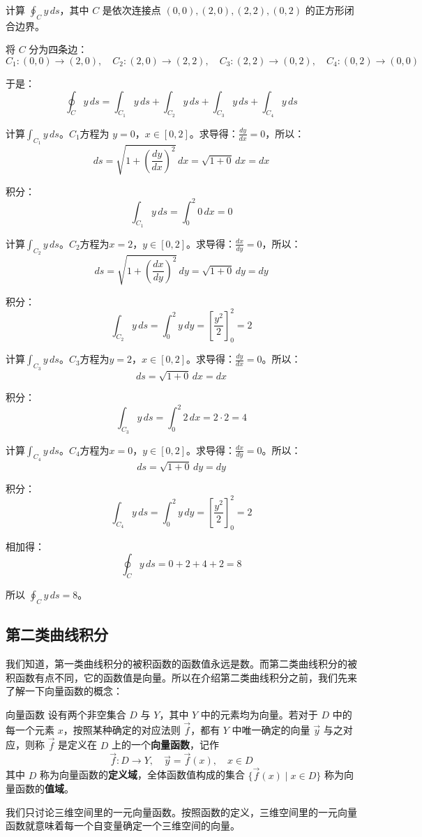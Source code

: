 \begin{myexample}
    计算 \(\oint_C y\,ds\)，其中 \(C\) 是依次连接点 \((0,0), (2,0), (2,2), (0,2)\) 的正方形闭合边界。

将 \(C\) 分为四条边：
\[
C_1: (0,0)\to(2,0),\quad C_2: (2,0)\to(2,2),\quad C_3: (2,2)\to(0,2),\quad C_4: (0,2)\to(0,0)
\]

于是：
\[
\oint_C y\,ds = \int_{C_1} y\,ds + \int_{C_2} y\,ds + \int_{C_3} y\,ds + \int_{C_4} y\,ds
\]

计算\(\int_{C_1} y\,ds\)。\(C_1\)方程为 \(y=0\)，\(x\in[0,2]\)。求导得：\(\frac{dy}{dx}=0\)，所以：
\[
ds = \sqrt{1+\left(\frac{dy}{dx}\right)^2}\,dx = \sqrt{1+0}\,dx = dx
\]

积分：
\[
\int_{C_1} y\,ds = \int_{0}^{2} 0\,dx = 0
\]

计算\(\int_{C_2} y\,ds\)。\(C_2\)方程为\(x=2\)，\(y\in[0,2]\)。求导得：\(\frac{dx}{dy}=0\)，所以：
\[
ds = \sqrt{1+\left(\frac{dx}{dy}\right)^2}\,dy = \sqrt{1+0}\,dy = dy
\]

积分：
\[
\int_{C_2} y\,ds = \int_{0}^{2} y\,dy = \left[\frac{y^2}{2}\right]_{0}^{2} = 2
\]

计算\(\int_{C_3} y\,ds\)。\(C_3\)方程为\(y=2\)，\(x\in[0,2]\)。求导得：\(\frac{dy}{dx}=0\)。所以：
\[
ds = \sqrt{1+0}\,dx = dx
\]

积分：
\[
\int_{C_3} y\,ds = \int_{0}^{2} 2\,dx = 2\cdot 2 = 4
\]

计算\(\int_{C_4} y\,ds\)。\(C_4\)方程为\(x=0\)，\(y\in[0,2]\)。求导得：\(\frac{dx}{dy}=0\)。所以：
\[
ds = \sqrt{1+0}\,dy = dy
\]

积分：
\[
\int_{C_4} y\,ds = \int_{0}^{2} y\,dy = \left[\frac{y^2}{2}\right]_{0}^{2} = 2
\]

相加得：
\[
\oint_C y\,ds = 0 + 2 + 4 + 2 = 8
\]

所以 \(\oint_C y\,ds = 8\)。
\end{myexample}

\subsection{第二类曲线积分}
我们知道，第一类曲线积分的被积函数的函数值永远是数。而第二类曲线积分的被积函数有点不同，它的函数值是向量。所以在介绍第二类曲线积分之前，我们先来了解一下向量函数的概念：
\begin{definition}{向量函数}{}
    设有两个非空集合 \(D\) 与 \(Y\)，其中 \(Y\) 中的元素均为向量。若对于 \(D\) 中的每一个元素 \(x\)，按照某种确定的对应法则 \(\vec{f}\)，都有 \(Y\) 中唯一确定的向量 \(\vec{y}\) 与之对应，则称 \(\vec{f}\) 是定义在 \(D\) 上的一个\textbf{向量函数}，记作
\[
\vec{f}: D \to Y, \quad \vec{y} = \vec{f}(x), \quad x \in D
\]
其中 \(D\) 称为向量函数的\textbf{定义域}，全体函数值构成的集合 \(\{\vec{f}(x) \mid x \in D\}\) 称为向量函数的\textbf{值域}。
\end{definition}
我们只讨论三维空间里的一元向量函数。按照函数的定义，三维空间里的一元向量函数就意味着每一个自变量确定一个三维空间的向量。

